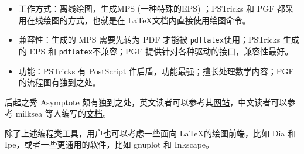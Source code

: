 \begin{itemize}
\item 工作方式：\MP 离线绘图，生成MPS (一种特殊的EPS) ；PSTricks 和 PGF 都采用在线绘图的方式，也就是在 \LaTeX 文档内直接使用绘图命令。
\item 兼容性：\MP 生成的 MPS 需要先转为 PDF 才能被 \texttt{pdflatex}使用；PSTricks 生成的 EPS 和 \texttt{pdflatex}不兼容；PGF 提供针对各种驱动的接口，兼容性最好。
\item 功能：PSTricks 有 PostScript 作后盾，功能最强；\MP 擅长处理数学内容；PGF的流程图有独到之处。
\end{itemize}

后起之秀 Asymptote 颇有独到之处，英文读者可以参考其\href{http://asymptote.sourceforge.net/}{网站}，中文读者可以参考 milksea 等人编写的\href{http://bbs.ctex.org/viewthread.php?tid=47893&extra=page%3D1}{文档}。

除了上述编程类工具，用户也可以考虑一些面向 \LaTeX 的绘图前端，比如 Dia 和 Ipe，或者一些更通用的软件，比如 gnuplot 和 Inkscape。



